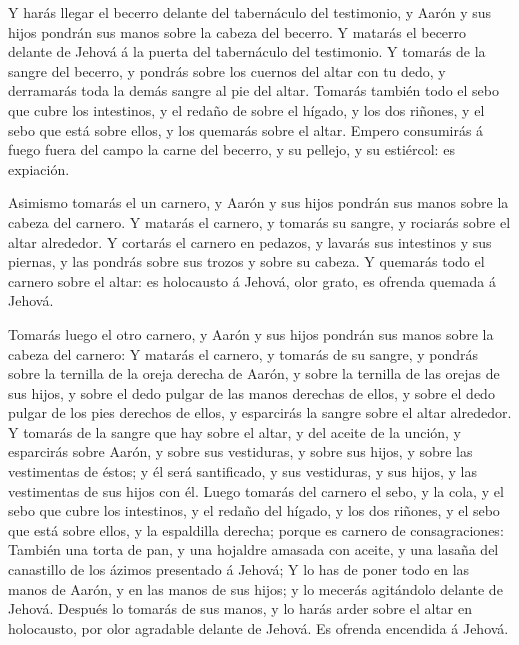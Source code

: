  Y harás llegar el becerro delante del tabernáculo del
testimonio, y Aarón y sus hijos pondrán sus manos sobre la cabeza del
becerro.  Y matarás el becerro delante de Jehová á la
puerta del tabernáculo del testimonio.  Y tomarás de la
sangre del becerro, y pondrás sobre los cuernos del altar con tu dedo, y
derramarás toda la demás sangre al pie del altar.  Tomarás
también todo el sebo que cubre los intestinos, y el redaño de sobre el
hígado, y los dos riñones, y el sebo que está sobre ellos, y los
quemarás sobre el altar.  Empero consumirás á fuego fuera
del campo la carne del becerro, y su pellejo, y su estiércol: es
expiación.

 Asimismo tomarás el un carnero, y Aarón y sus hijos
pondrán sus manos sobre la cabeza del carnero.  Y matarás
el carnero, y tomarás su sangre, y rociarás sobre el altar alrededor.
 Y cortarás el carnero en pedazos, y lavarás sus intestinos
y sus piernas, y las pondrás sobre sus trozos y sobre su cabeza.
 Y quemarás todo el carnero sobre el altar: es holocausto á
Jehová, olor grato, es ofrenda quemada á Jehová.

 Tomarás luego el otro carnero, y Aarón y sus hijos pondrán
sus manos sobre la cabeza del carnero:  Y matarás el
carnero, y tomarás de su sangre, y pondrás sobre la ternilla de la oreja
derecha de Aarón, y sobre la ternilla de las orejas de sus hijos, y
sobre el dedo pulgar de las manos derechas de ellos, y sobre el dedo
pulgar de los pies derechos de ellos, y esparcirás la sangre sobre el
altar alrededor.  Y tomarás de la sangre que hay sobre el
altar, y del aceite de la unción, y esparcirás sobre Aarón, y sobre sus
vestiduras, y sobre sus hijos, y sobre las vestimentas de éstos; y él
será santificado, y sus vestiduras, y sus hijos, y las vestimentas de
sus hijos con él.  Luego tomarás del carnero el sebo, y la
cola, y el sebo que cubre los intestinos, y el redaño del hígado, y los
dos riñones, y el sebo que está sobre ellos, y la espaldilla derecha;
porque es carnero de consagraciones:  También una torta de
pan, y una hojaldre amasada con aceite, y una lasaña del canastillo de
los ázimos presentado á Jehová;  Y lo has de poner todo en
las manos de Aarón, y en las manos de sus hijos; y lo mecerás agitándolo
delante de Jehová.  Después lo tomarás de sus manos, y lo
harás arder sobre el altar en holocausto, por olor agradable delante de
Jehová. Es ofrenda encendida á Jehová.

